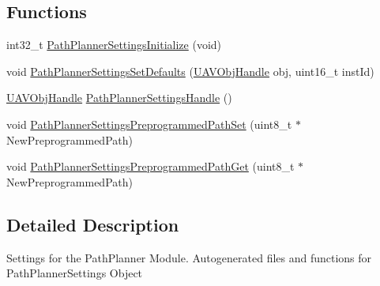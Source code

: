 \subsection*{\-Functions}
\begin{DoxyCompactItemize}
\item 
int32\-\_\-t \hyperlink{group___path_planner_settings_ga098aefdc3a04dc2473ae5e7e7e9704b3}{\-Path\-Planner\-Settings\-Initialize} (void)
\item 
void \hyperlink{group___path_planner_settings_ga9811870ee801bcfc425805912cd7b796}{\-Path\-Planner\-Settings\-Set\-Defaults} (\hyperlink{targets_2_u_a_v_objects_2inc_2uavobjectmanager_8h_a279053e22be53ce9f895043aaeb91e3b}{\-U\-A\-V\-Obj\-Handle} obj, uint16\-\_\-t inst\-Id)
\item 
\hyperlink{targets_2_u_a_v_objects_2inc_2uavobjectmanager_8h_a279053e22be53ce9f895043aaeb91e3b}{\-U\-A\-V\-Obj\-Handle} \hyperlink{group___path_planner_settings_ga249cd97b9bec8c81dba1f44e7043cc13}{\-Path\-Planner\-Settings\-Handle} ()
\item 
void \hyperlink{group___path_planner_settings_ga043551e7882b2d03eb96b0c059c67d10}{\-Path\-Planner\-Settings\-Preprogrammed\-Path\-Set} (uint8\-\_\-t $\ast$\-New\-Preprogrammed\-Path)
\item 
void \hyperlink{group___path_planner_settings_ga6a607dc1dab3a677ac0d172aee13ac65}{\-Path\-Planner\-Settings\-Preprogrammed\-Path\-Get} (uint8\-\_\-t $\ast$\-New\-Preprogrammed\-Path)
\end{DoxyCompactItemize}


\subsection{\-Detailed \-Description}
\-Settings for the \-Path\-Planner \-Module. \-Autogenerated files and functions for \-Path\-Planner\-Settings \-Object 

